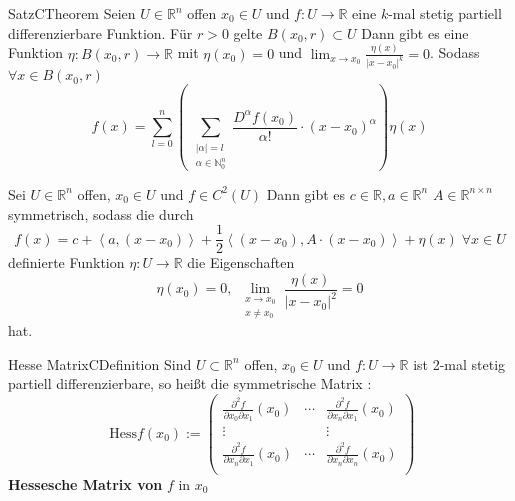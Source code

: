 %
%
%
%
\begin{ibox}[41]{Satz}{CTheorem}
    Seien $ U \in \mathbb{R}^n  $ offen $ x_0 \in U $ und $ f: U \to \mathbb{R}  $ eine $ k $-mal stetig partiell differenzierbare 
	Funktion. Für $ r>0 $ gelte $ B(x_0,r) \subset U$  Dann gibt es eine Funktion $ \eta : B \left( x_0, r \right) \to \mathbb{R}  $ 
	mit $ \eta \left(x_0\right)  = 0 $ und $ \lim_{ x \to x_0} \frac{\eta \left(x\right) }{|x-x_0|^{k}}  = 0 $. Sodass $ \forall  x \in 
	B \left( x_0, r \right) $ 
	$$ f(x) = \sum_{l=0}^{n} \left(\, \sum_{\substack{ |\alpha| = l \\ \alpha \in \mathbb{N}_{0}^{n} }} \frac{D^{\alpha }f
	\left(x_0\right) }{\alpha !} \cdot \left( x - x_0 \right) ^{\alpha }  \right) \eta \left(x\right)   $$
\end{ibox}
Sei $ U \in \mathbb{R}^n  $ offen, $ x_0 \in U $ und $ f \in  C^{2} \left(U\right)  $ Dann gibt es $ c \in \mathbb{R} , a \in \mathbb{R}^n $
$ A \in \mathbb{R}^{n \times n}  $ symmetrisch, sodass die durch 
$$ f \left(x\right)  = c + \left< a, \left( x - x_0 \right)  \right> + \frac{1}{2} \left<(x-x_0), A \cdot (x-x_0) \right> + 
\eta \left(x\right) \; \forall x \in U	$$ 
definierte Funktion $ \eta : U \to \mathbb{R}  $ die Eigenschaften 
$$ \eta \left(x_0\right)  = 0 , \; \lim_{ \substack{ x \to x_0 \\x \neq x_0 } } \frac{\eta \left(x\right) }{ |x - x_0|^{2}} = 0  $$
hat.
\begin{ibox}[]{Hesse Matrix}{CDefinition}
    Sind $ U \subset \mathbb{R}^n  $ offen, $ x_0 \in U $ und $ f: U \to \mathbb{R}  $ ist 2-mal stetig partiell differenzierbare, so
	heißt die symmetrische Matrix : 
	$$ \text{ Hess}f \left(x_0\right) := \begin{pmatrix}
		\frac{\partial ^{2} f}{\partial x_0 \partial x_1} \left(x_0\right) & \cdots    
	 	&\frac{\partial ^{2} f}{\partial x_n \partial x_1} \left(x_0\right) \\
		\vdots & & \vdots \\
		\frac{\partial ^{2} f}{\partial x_n \partial x_1} \left(x_0\right) & \cdots    
	 	&\frac{\partial ^{2} f}{\partial x_n \partial x_n} \left(x_0\right) \\
	\end{pmatrix}
	  $$
\textbf{Hessesche Matrix von} $ f \text{ in } x_0 $ 	
\end{ibox}
